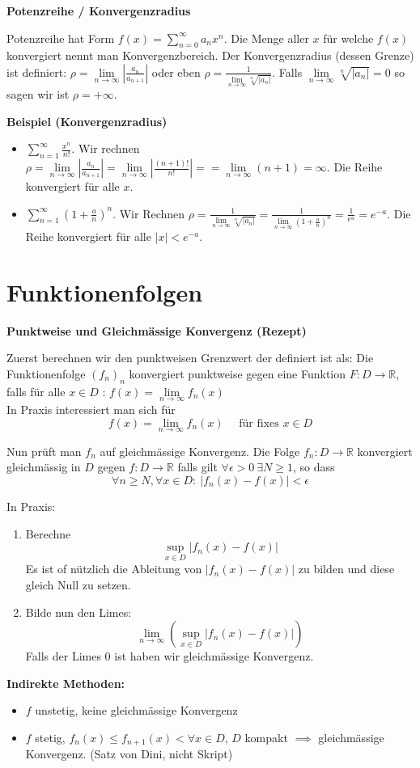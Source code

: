 \documentclass[25pt]{sciposter}
\newcommand{\limm}{\lim\limits_{n \to \infty}}
\newcommand{\R}{\mathbb{R}}
\newenvironment{method}[1]{\begin{mdframed}[backgroundcolor=blue!10,innertopmargin=15pt, innerbottommargin=15pt, nobreak=true]
		\textbf{#1 }
	}
	{ 
	\end{mdframed}
}
\begin{document}
\begin{multicols}{3}
\begin{method}{Potenzreihe / Konvergenzradius}
	Potenzreihe hat Form $f(x) = \sum_{n=0}^{\infty} a_n x^n$.
	Die Menge aller $x$ für welche $f(x)$ konvergiert nennt man Konvergenzbereich. Der Konvergenzradius (dessen Grenze) ist definiert:
	$\rho = \limm \left|  \frac{a_n}{a_{n+1}}\right|$ oder eben $\rho = \frac{1}{\limm \sqrt[n]{|a_n|}}$. Falls $\limm \sqrt[n]{|a_n|}=0 $ so sagen wir ist $\rho = + \infty$.
\end{method}

\textbf{Beispiel (Konvergenzradius)}
\begin{itemize}
	\item $\sum_{n=1}^\infty  \frac{x^n}{n!}$. Wir rechnen $\rho = \limm \left|\frac{a_n}{a_{n+1}}\right| = \limm \left| \frac{(n+1)!}{n!} \right| = = \limm (n+1 ) = \infty$. Die Reihe konvergiert für alle $x$.
	\item $\sum_{n=1}^{\infty} \left( 1 + \frac{a}{n} \right)^n$. Wir Rechnen $\rho = \frac{1}{\limm \sqrt[n]{|a_n|}} = \frac{1}{\limm (1 + \frac{a}{n})^n} = \frac{1}{e^a} = e^{-a}$. Die Reihe konvergiert für alle $|x| < e^{-a}$.
\end{itemize}

\vfill\null
\columnbreak

\section{Funktionenfolgen}
\begin{method}{Punktweise und Gleichmässige Konvergenz (Rezept)}
Zuerst berechnen wir den punktweisen Grenzwert der definiert ist als: 	Die Funktionenfolge $(f_n)_n$ konvergiert punktweise gegen eine Funktion $F: D \to \R$, falls für alle $x \in D$ : $f(x) = \limm f_n(x)$ \\

In Praxis interessiert man sich für 
$$f(x) = \limm f_n(x) \quad \text{ für fixes $x \in D$}$$

Nun prüft man $f_n$ auf gleichmässige Konvergenz. 	Die Folge $f_n : D \to \R$ konvergiert gleichmässig in $D$ gegen $f:D \to \R$ falls gilt $ \forall \epsilon > 0 \ \exists N \geq 1$, so dass 
$$ \forall n \geq N , \forall x \in D : \ |f_n(x) - f(x)| < \epsilon$$

In Praxis:
\begin{enumerate}
	\item Berechne $$\sup_{x\in D} |f_n(x) -f(x)|$$ Es ist of nützlich die Ableitung von $|f_n(x) -f(x)|$ zu bilden und diese gleich Null zu setzen.
	\item Bilde nun den Limes: $$\limm \left(\sup_{x\in D} |f_n(x) -f(x)|\right)$$ Falls der Limes 0 ist haben wir gleichmässige Konvergenz.
\end{enumerate}
\textbf{Indirekte Methoden:}
\begin{itemize}
	\item $f$ unstetig, keine gleichmässige Konvergenz
	\item $f$ stetig, $f_n (x)\leq f_{n+1}(x) < \forall x \in D$, $D$ kompakt $\implies$ gleichmässige Konvergenz. (Satz von Dini, nicht Skript)
\end{itemize}
\end{method}



\end{multicols}
\end{document}
